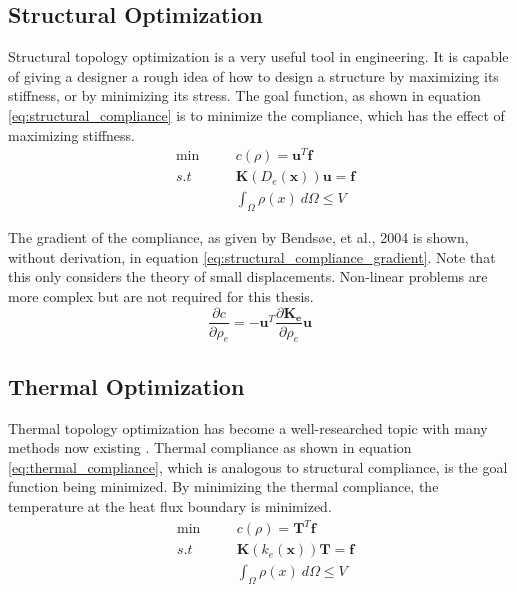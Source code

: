 \subsection*{Structural Optimization}
Structural topology optimization is a very useful tool in engineering. It is capable of giving a designer a rough idea of how to design a structure by maximizing its stiffness, or by minimizing its stress. The goal function, as shown in equation \ref{eq:structural_compliance} is to minimize the compliance, which has the effect of maximizing stiffness.
\begin{equation}
    \begin{alignedat}{2}
        &\min \quad &&c(\rho) = \mathbf{u}^T\mathbf{f} \\
        & s.t \quad &&\mathbf{K}(D_e(\mathbf{x}))\mathbf{u}=\mathbf{f} \\ 
        & && \int_\Omega \rho(x) \ d\Omega \leq V
    \end{alignedat}
    \label{eq:structural_compliance}
\end{equation}

The gradient of the compliance, as given by Bendsøe, et al., 2004 \cite{Bendsøe_2004} is shown, without derivation, in equation \ref{eq:structural_compliance_gradient}. Note that this only considers the theory of small displacements. Non-linear problems are more complex but are not required for this thesis.
\begin{equation}
    \frac{\partial c}{\partial \rho_e} = -\mathbf{u}^T\frac{\partial\mathbf{K_e}}{\partial\rho_e}\mathbf{u}
    \label{eq:structural_compliance_gradient}
\end{equation}

\subsection*{Thermal Optimization}
Thermal topology optimization has become a well-researched topic with many methods now existing \cite{Bendsøe_2004} \cite{Alexandersen_Sigmund_Aage_2016}. Thermal compliance as shown in equation \ref{eq:thermal_compliance}, which is analogous to structural compliance, is the goal function being minimized. By minimizing the thermal compliance, the temperature at the heat flux boundary is minimized. 
\begin{equation}
    \begin{alignedat}{2}
        &\min \quad &&c(\rho) = \mathbf{T}^T\mathbf{f} \\
        & s.t \quad &&\mathbf{K}(k_e(\mathbf{x}))\mathbf{T}=\mathbf{f} \\ 
        & && \int_\Omega \rho(x) \ d\Omega \leq V
    \end{alignedat}
    \label{eq:thermal_compliance}
\end{equation}

